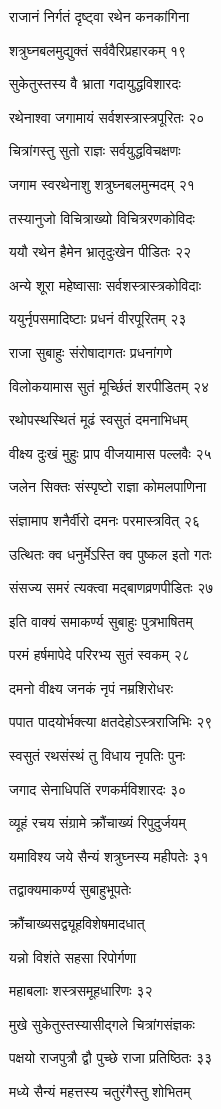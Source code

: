 राजानं निर्गतं दृष्ट्वा रथेन कनकांगिना

शत्रुघ्नबलमुद्युक्तं सर्ववैरिप्रहारकम् १९

सुकेतुस्तस्य वै भ्राता गदायुद्धविशारदः

रथेनाश्वा जगामायं सर्वशस्त्रास्त्रपूरितः २०

चित्रांगस्तु सुतो राज्ञः सर्वयुद्धविचक्षणः

जगाम स्वरथेनाशु शत्रुघ्नबलमुन्मदम् २१

तस्यानुजो विचित्राख्यो विचित्ररणकोविदः

ययौ रथेन हैमेन भ्रातृदुःखेन पीडितः २२

अन्ये शूरा महेष्वासाः सर्वशस्त्रास्त्रकोविदाः

ययुर्नृपसमादिष्टाः प्रधनं वीरपूरितम् २३

राजा सुबाहुः संरोषादागतः प्रधनांगणे

विलोकयामास सुतं मूर्च्छितं शरपीडितम् २४

रथोपस्थस्थितं मूढं स्वसुतं दमनाभिधम्

वीक्ष्य दुःखं मुहुः प्राप वीजयामास पल्लवैः २५

जलेन सिक्तः संस्पृष्टो राज्ञा कोमलपाणिना

संज्ञामाप शनैर्वीरो दमनः परमास्त्रवित् २६

उत्थितः क्व धनुर्मेऽस्ति क्व पुष्कल इतो गतः

संसज्य समरं त्यक्त्वा मद्बाणव्रणपीडितः २७

इति वाक्यं समाकर्ण्य सुबाहुः पुत्रभाषितम्

परमं हर्षमापेदे परिरभ्य सुतं स्वकम् २८

दमनो वीक्ष्य जनकं नृपं नम्रशिरोधरः

पपात पादयोर्भक्त्या क्षतदेहोऽस्त्रराजिभिः २९

स्वसुतं रथसंस्थं तु विधाय नृपतिः पुनः

जगाद सेनाधिपतिं रणकर्मविशारदः ३०

व्यूहं रचय संग्रामे क्रौंचाख्यं रिपुदुर्जयम्

यमाविश्य जये सैन्यं शत्रुघ्नस्य महीपतेः ३१

तद्वाक्यमाकर्ण्य सुबाहुभूपतेः

क्रौंचाख्यसद्व्यूहविशेषमादधात्

यन्नो विशंते सहसा रिपोर्गणा

महाबलाः शस्त्रसमूहधारिणः ३२

मुखे सुकेतुस्तस्यासीद्गले चित्रांगसंज्ञकः

पक्षयो राजपुत्रौ द्वौ पुच्छे राजा प्रतिष्ठितः ३३

मध्ये सैन्यं महत्तस्य चतुरंगैस्तु शोभितम्

